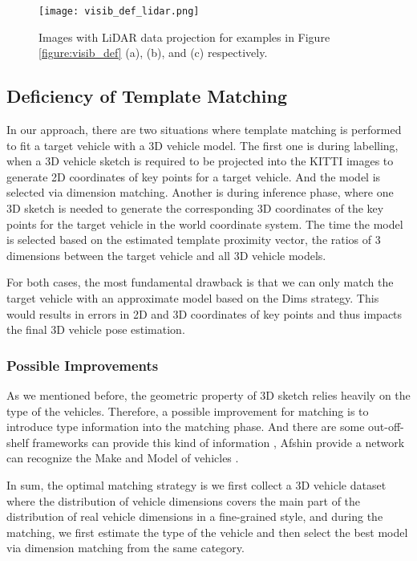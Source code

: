 \begin{figure}[H]		
	\texttt{[image: visib\_def\_lidar.png]}
	\caption{Images with LiDAR data projection for examples in Figure \ref{figure:visib_def} (a), (b), and (c) respectively.}
	\centering
	\label{figure:visib_def_lidar}
\end{figure}

\subsection{Deficiency of Template Matching}
In our approach, there are two situations where template matching is performed to fit a target vehicle with a 3D vehicle model. The first one is during labelling, when a 3D vehicle sketch is required to be projected into the KITTI images to generate 2D coordinates of key points for a target vehicle. And the model is selected via dimension matching. Another is during inference phase, where one 3D sketch is needed to generate the corresponding 3D coordinates of the key points for the target vehicle in the world coordinate system. The time the model is selected based on the estimated template proximity vector, \ie the ratios of 3 dimensions between the target vehicle and all 3D vehicle models.

For both cases, the most fundamental drawback is that we can only match the target vehicle with an approximate model based on the Dims strategy. This would results in errors in 2D and 3D coordinates of key points and thus impacts the final 3D vehicle pose estimation.

\subsubsection{Possible Improvements}
As we mentioned before, the geometric property of 3D sketch relies heavily on the type of the vehicles. Therefore, a possible improvement for matching is to introduce type information into the matching phase. And there are some out-off-shelf frameworks can provide this kind of information \cite{DBLP:journals/corr/YangLLT15, 7780697, 7410527, DBLP:journals/corr/DehghanMSO17}, \ie Afshin \etal provide a network can recognize the Make and Model of vehicles \cite{DBLP:journals/corr/DehghanMSO17}. 

In sum, the optimal matching strategy is we first collect a 3D vehicle dataset where the distribution of vehicle dimensions covers the main part of the distribution of real vehicle dimensions in a fine-grained style, and during the matching, we first estimate the type of the vehicle and then select the best model via dimension matching from the same category. 

